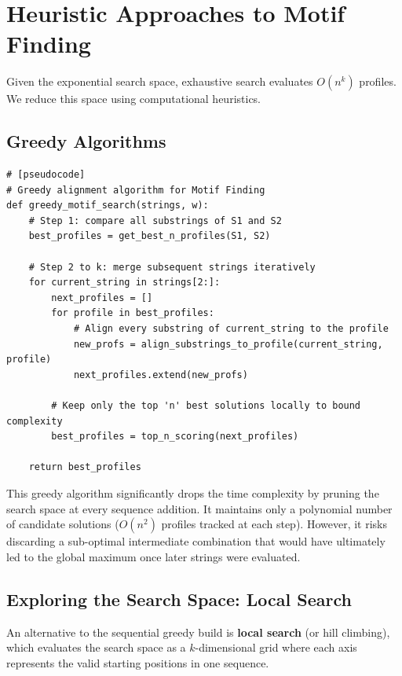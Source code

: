 \section{Heuristic Approaches to Motif Finding}

Given the exponential search space, exhaustive search evaluates $O(n^k)$ profiles. We reduce this space using computational heuristics.

\subsection{Greedy Algorithms}

\begin{verbatim}
# [pseudocode]
# Greedy alignment algorithm for Motif Finding
def greedy_motif_search(strings, w):
    # Step 1: compare all substrings of S1 and S2
    best_profiles = get_best_n_profiles(S1, S2) 
    
    # Step 2 to k: merge subsequent strings iteratively
    for current_string in strings[2:]:
        next_profiles = []
        for profile in best_profiles:
            # Align every substring of current_string to the profile
            new_profs = align_substrings_to_profile(current_string, profile)
            next_profiles.extend(new_profs)
        
        # Keep only the top 'n' best solutions locally to bound complexity
        best_profiles = top_n_scoring(next_profiles) 
        
    return best_profiles
\end{verbatim}
This greedy algorithm significantly drops the time complexity by pruning the search space at every sequence addition. It maintains only a polynomial number of candidate solutions ($O(n^2)$ profiles tracked at each step). 
However, it risks discarding a sub-optimal intermediate combination that would have ultimately led to the global maximum once later strings were evaluated.

\subsection{Exploring the Search Space: Local Search}

An alternative to the sequential greedy build is \textbf{local search} (or hill climbing), which evaluates the search space as a $k$-dimensional grid where each axis represents the valid starting positions in one sequence.

